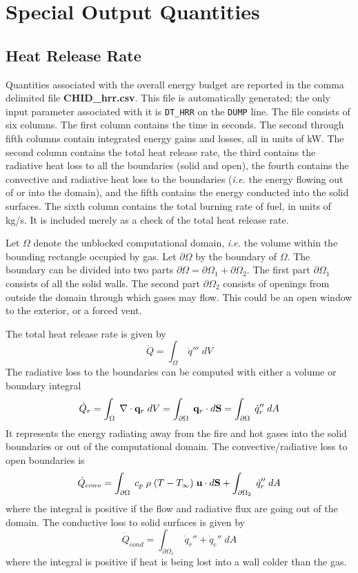 \documentclass[11pt]{book}
\newcommand{\ct}{\tt\small}
\newcommand{\dS}{{d\bf S}}
\newcommand{\dA}{{dA}}
\newcommand{\bq}{{\bf q}}
\newcommand{\bu}{{\bf u}}
\newcommand{\dq}{\dot{q}}
\newcommand{\be}{\begin{equation}}
\newcommand{\ee}{\end{equation}}
\begin{document}
\clearpage

\section{Special Output Quantities}

\subsection{Heat Release Rate}
\label{info:HRR} 

Quantities associated with the overall energy budget are
reported in the comma delimited file {\bf CHID\_hrr.csv}.
This file is automatically generated; the only input parameter associated with it is
{\ct DT\_HRR} on the {\ct DUMP} line. The file consists of six columns.
The first column contains the time in seconds. The second through
fifth columns contain integrated energy gains and losses, all in
units of kW. The second column contains the total heat release rate, the third contains the
radiative heat loss to all the boundaries (solid and open), the fourth contains the
convective and radiative heat loss to the boundaries ({\em i.e.} the energy
flowing out of or into the domain), and the fifth contains the energy conducted
into the solid surfaces.
The sixth column contains the total burning rate of fuel, in units of kg/s. It is included merely as a check
of the total heat release rate.

Let $\Omega$ denote the unblocked computational domain, {\em i.e.} the volume within the bounding rectangle
occupied by gas. Let $\partial \Omega$ by the boundary of $\Omega$. The boundary can be divided into two parts
$\partial \Omega = \partial \Omega_1 + \partial \Omega_2$. The first part $\partial \Omega_1$ consists of all the solid
walls. The second part $\partial \Omega_2$ consists of openings from outside the domain through which gases may flow. This
could be an open window to the exterior, or a forced vent.

The total heat release rate is given by
\be \dot{Q} = \int_\Omega \; \dq''' \; dV \ee
The radiative loss to the
boundaries can be computed with either a volume or boundary integral
\be \dot{Q}_r = \int_\Omega \; \nabla \cdot \bq_r \; dV =
\int_{\partial \Omega} \; \bq_r \cdot \dS = \int_{\partial \Omega} \; \dq_r'' \; \dA \ee
It represents the energy radiating away from the fire and hot gases into
the solid boundaries or out of the computational domain. The convective/radiative
loss to open boundaries is
\be \dot{Q}_{conv} =  \int_{\partial \Omega} \; c_p \; \rho \; (T-T_\infty) \; \bu \cdot \dS
   + \int_{\partial \Omega_2} \; \dq_r'' \; \dA  \ee
where the integral is positive if the flow and radiative flux are going out of the domain.
The conductive loss to solid surfaces is given by
\be \dot{Q}_{cond} = \int_{\partial \Omega_1} \; \dq_r'' + \dq_c'' \; \dA  \ee
where the integral is positive if heat is being lost into a wall colder
than the gas.
\end{document}
